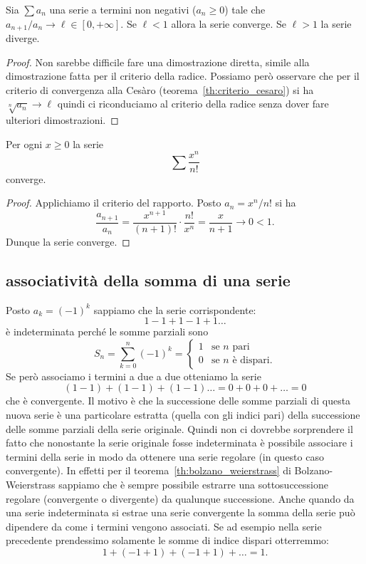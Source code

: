 \begin{theorem}
\mymark{***}
Sia $\sum a_n$ una serie a termini non negativi
($a_n\ge 0$)
tale che $a_{n+1} / a_n \to \ell \in [0,+\infty]$.
Se $\ell <1$ allora la serie converge.
Se $\ell > 1$ la serie diverge.
\end{theorem}
%
\begin{proof}
\mymark{*}
Non sarebbe difficile fare una dimostrazione diretta, simile alla dimostrazione fatta per il criterio della radice.
Possiamo però osservare che
per il criterio di convergenza alla Cesàro (teorema~\ref{th:criterio_cesaro}) si ha $\sqrt[n]{a_n} \to \ell$
quindi ci riconduciamo al criterio della radice senza dover fare ulteriori dimostrazioni.
\end{proof}

\begin{example}
\mymark{***}
Per ogni $x\ge 0$ la serie
\[
  \sum \frac{x^n}{n!}
\]
converge.
\end{example}
%
\begin{proof}
Applichiamo il criterio del rapporto.
Posto $a_n = x^n / n!$ si ha
\[
\frac{a_{n+1}}{a_n}
= \frac{x^{n+1}}{(n+1)!}\cdot \frac{n!}{x^n}
= \frac{x}{n+1} \to 0 < 1.
\]
Dunque la serie converge.
\end{proof}

\subsection{associatività della somma di una serie}

\begin{example}
Posto $a_k = (-1)^k$ sappiamo che la serie corrispondente:
\[
  1 - 1 + 1 - 1 + 1 \dots
\]
è indeterminata perché le somme parziali sono
\[
  S_n = \sum_{k=0}^n (-1)^k
  = \begin{cases}
   1 & \text{se $n$ pari}\\
   0 & \text{se $n$ è dispari.}
  \end{cases}
\]
Se però associamo i termini a due a due otteniamo la serie
\[
  (1-1) + (1-1) + (1-1) \dots = 0 + 0 + 0 + \dots = 0
\]
che è convergente.
Il motivo è che la successione delle somme
parziali di questa nuova serie è una particolare estratta (quella
con gli indici pari) della successione delle somme parziali della
serie originale. Quindi non ci dovrebbe sorprendere il fatto che
nonostante la serie originale fosse indeterminata è possibile
associare i termini della serie in modo da ottenere una serie
regolare (in questo caso convergente).
In effetti per il teorema~\ref{th:bolzano_weierstrass} 
di Bolzano-Weierstrass sappiamo che
è sempre possibile estrarre una sottosuccessione regolare (convergente o divergente)
da qualunque successione.
Anche quando da una serie indeterminata si estrae una serie
convergente la somma della serie può dipendere da come i termini
vengono associati.
Se ad esempio nella serie precedente prendessimo
solamente le somme di indice dispari
otterremmo:
\[
  1 + (-1+1) + (-1+1) + \dots = 1.
\]
\end{example}

